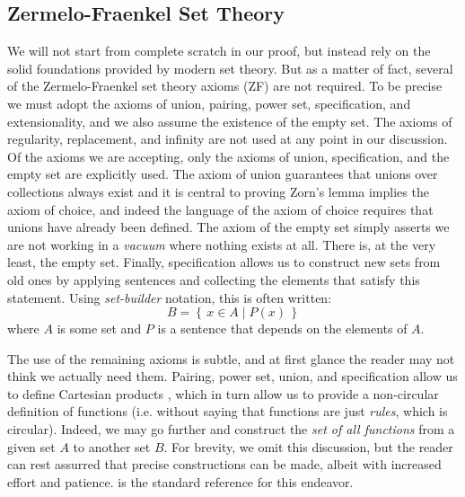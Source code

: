 \documentclass{article}
\theoremstyle{definition}
\begin{document}
        \subsection{Zermelo-Fraenkel Set Theory}
            We will not start from complete scratch in our proof, but instead
            rely on the solid foundations provided by modern set theory.
            But as a matter of fact, several of the Zermelo-Fraenkel set theory
            axioms (ZF) are not required. To be precise we must
            adopt the axioms of union, pairing, power set, specification,
            and extensionality, and we also assume the existence of the empty
            set. The axioms of regularity, replacement, and infinity are not
            used at any point in our discussion. Of the axioms we are accepting,
            only the axioms of union, specification, and the empty set are
            explicitly used.
            The axiom of union guarantees that unions over collections always
            exist and it is central to proving Zorn's lemma implies the axiom
            of choice, and indeed the language of the axiom of choice requires
            that unions have already been defined. The axiom of the empty set
            simply asserts we are not working in a \textit{vacuum} where
            nothing exists at all. There is, at the very least, the empty set.
            Finally, specification allows us to construct new sets from old
            ones by applying sentences and collecting the elements that
            satisfy this statement. Using \textit{set-builder} notation,
            this is often written:
            \begin{equation}
                B=\left\{\,
                    x\in{A}\;|\;P(x)\,
                \right\}
            \end{equation}
            where $A$ is some set and $P$ is a sentence that depends on the
            elements of $A$.
            \par\hfill\par
            The use of the remaining axioms is subtle, and at first glance the
            reader may not think we actually need them. Pairing, power set,
            union, and specification allow us to define Cartesian products
            \cite[p.~24]{Halmos1974},
            which in turn allow us to provide a non-circular definition of
            functions (i.e. without saying that functions are just
            \textit{rules}, which is circular). Indeed, we may go further and
            construct the \textit{set of all functions} from a given set $A$
            to another set $B$. For brevity, we omit this discussion, but the
            reader can rest assurred that precise constructions can be made,
            albeit with increased effort and patience.
            \cite{Halmos1974} is the standard reference for this endeavor.
\end{document}
